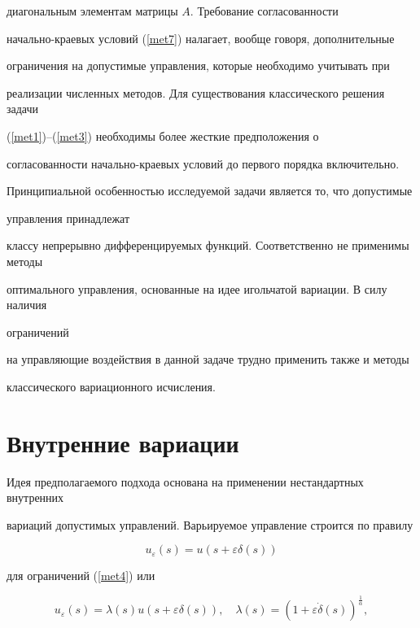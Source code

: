 диагональным элементам матрицы $A$. Требование согласованности 


начально-краевых условий (\ref{met7}) налагает, вообще говоря, дополнительные


ограничения на допустимые управления, которые необходимо учитывать при


реализации численных методов. Для существования классического решения задачи


(\ref{met1})--(\ref{met3}) необходимы более жесткие предположения о


согласованности начально-краевых условий до первого порядка включительно.





Принципиальной особенностью исследуемой задачи является то, что допустимые


управления принадлежат


классу непрерывно дифференцируемых функций. Соответственно не применимы методы


оптимального управления, основанные на идее игольчатой вариации. В силу наличия


ограничений


на управляющие воздействия в данной задаче трудно применить также и методы


классического вариационного исчисления.





\section{Внутренние вариации}





Идея предполагаемого подхода основана на применении нестандартных внутренних


вариаций допустимых управлений. Варьируемое управление строится по правилу


\begin{equation}


u_\varepsilon (s)=u(s+\varepsilon \delta(s))


\label{met8}


\end{equation}


для ограничений (\ref{met4}) или


\begin{equation}


u_\varepsilon (s)=\lambda(s) u(s+\varepsilon\delta (s)),\quad


\lambda(s)=(1+\varepsilon \Dot{\delta}(s))^{\frac{1}{\alpha}},


\label{met9}


\end{equation}


